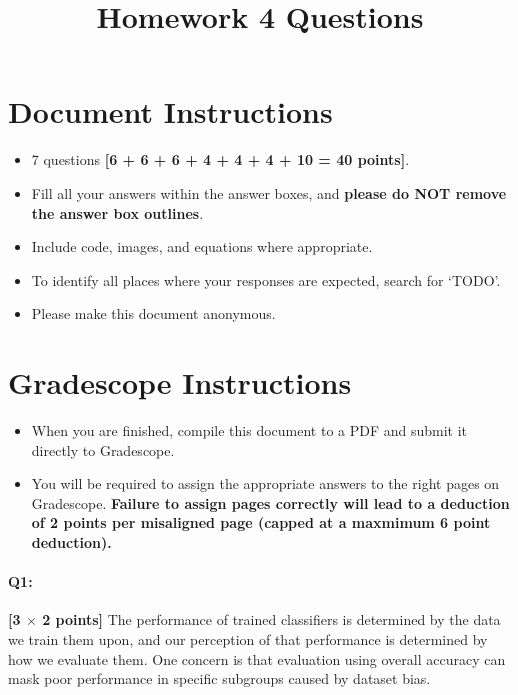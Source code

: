 \date{}

\title{\vspace{-2cm}Homework 4 Questions}



\maketitle
\thispagestyle{fancy}
\vspace{-3cm}

\section*{Document Instructions}
\begin{itemize}
  \item 7 questions \textbf{[6 + 6 + 6 + 4 + 4 + 4 + 10 = 40 points]}.
  \item Fill all your answers within the answer boxes, and \textbf{please do NOT remove the answer box outlines}.
  \item Include code, images, and equations where appropriate.
  \item To identify all places where your responses are expected, search for `TODO'.
  \item Please make this document anonymous.
\end{itemize}

\section*{ Gradescope Instructions}
\begin{itemize}
  \item When you are finished, compile this document to a PDF and submit it directly to Gradescope. 
  \item You will be required to assign the appropriate answers to the right pages on Gradescope. \textbf{Failure to assign pages correctly will lead to a deduction of 2 points per misaligned page (capped at a maxmimum 6 point deduction).}
\end{itemize}
\pagebreak


\paragraph{Q1:} \textbf{[3 $\times$ 2 points]} The performance of trained classifiers is determined by the data we train them upon, and our perception of that performance is determined by how we evaluate them. One concern is that evaluation using overall accuracy can mask poor performance in specific subgroups caused by dataset bias.


